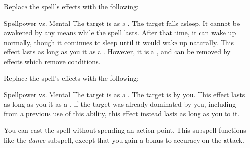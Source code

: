 Replace the spell's effects with the following:
\begin{spellcontent}
\begin{augmenteffects}
\begin{spellattack}{Spellpower vs. Mental}
\spellsuccess The target is \blinded as a .
\spellcritical
The target falls asleep.
It cannot be awakened by any means while the spell lasts.
After that time, it can wake up normally, though it continues to sleep until it would wake up naturally.
This effect lasts as long as you  it as a .
However, it is a , and can be removed by effects which remove conditions.
\end{spellattack}
\end{augmenteffects}
\end{spellcontent}
Replace the spell's effects with the following:
\begin{spellcontent}
\begin{augmenteffects}
\begin{spellattack}{Spellpower vs. Mental}
\spellsuccess
The target is  as a .
\spellcritical
The target is  by you.
This effect lasts as long as you  it as a .
If the target was already dominated by you, including from a previous use of this ability, this effect instead lasts as long as you  to it.
\end{spellattack}
\end{augmenteffects}
\end{spellcontent}
You can cast the spell without spending an action point.
This subspell functions like the \textit{dance} subspell, except that you gain a  bonus to accuracy on the attack.
